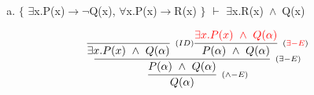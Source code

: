 \documentclass[aspectratio=43]{beamer}
\newcommand{\ria}{$\rightarrow$}
\newcommand{\fall}{$\forall$}
\newcommand{\ex}{$\exists$}
\newcommand{\nao}{$\neg$}
\newcommand{\andd}{$\wedge$}
\begin{document}
     \begin{frame}[fragile]
    
    	\begin{enumerate}[d)]
			\item $\{$ \ex x.P(x)\ria \nao Q(x), \fall x.P(x)\ria R(x) $\}$ $\vdash$ \ex x.R(x)\ \andd\ Q(x) \\
		\end{enumerate}
        
        \vspace{80pt}
        
        \[
        \begin{array}{c}
		
        	\infer[_{(\land -E)}] 
                	{Q(\alpha)}
                    {\infer[_{(\exists -E)}]
                    	{P(\alpha)\ \land \ Q(\alpha)}
                    	{\infer[_{(ID)}]
                        	{\exists x.P(x)\ \land \ Q(\alpha)}
                            {}
                        \infer[_{(\textcolor{red}{\exists -E})}] 
                        	{P(\alpha)\ \land \ Q(\alpha)}
                            {\textcolor{red}{\exists x.P(x)\ \land \ Q(\alpha)}}
                        }
                    }
		\end{array}
        \]
        
	\end{frame}
        
\end{document}
